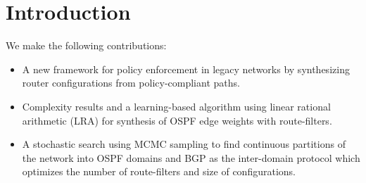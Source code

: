\section{Introduction}
 We make the following contributions:
\begin{itemize}
	\item A new framework for policy enforcement in legacy networks
	by synthesizing router configurations from policy-compliant paths.
	\item Complexity results and a learning-based algorithm using
	linear rational arithmetic (LRA) for synthesis
	of OSPF edge weights with route-filters.
	\item A stochastic search using MCMC sampling to find 
	continuous partitions of the network into OSPF domains and BGP as 
	the inter-domain protocol which optimizes the number of
	route-filters and size of configurations. 
\end{itemize}